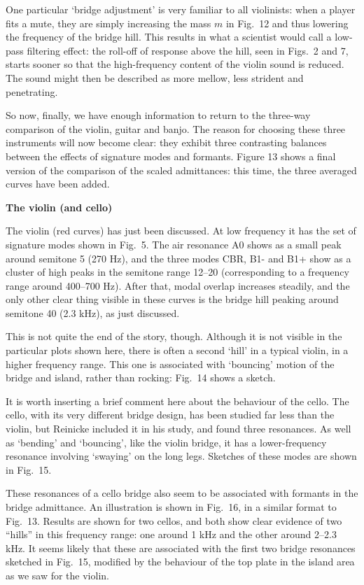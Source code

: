   One particular `bridge adjustment' is very familiar to all violinists: when a 
  player fits a mute, they are simply increasing the mass $m$ in Fig.\ 12 and 
  thus lowering the frequency of the bridge hill. This results in what a 
  scientist would call a low-pass filtering effect: the roll-off of response 
  above the hill, seen in Figs.\ 2 and 7, starts sooner so that the 
  high-frequency content of the violin sound is reduced. The sound might then 
  be described as more mellow, less strident and penetrating. 

  So now, finally, we have enough information to return to the three-way 
  comparison of the violin, guitar and banjo. The reason for choosing these 
  three instruments will now become clear: they exhibit three contrasting 
  balances between the effects of signature modes and formants. Figure 13 shows 
  a final version of the comparison of the scaled admittances: this time, the 
  three averaged curves have been added. 

  \textbf{The violin (and cello)} 

  The violin (red curves) has just been discussed. At low frequency it has the 
  set of signature modes shown in Fig.\ 5. The air resonance A0 shows as a 
  small peak around semitone 5 (270 Hz), and the three modes CBR, B1- and B1+ 
  show as a cluster of high peaks in the semitone range 12--20 (corresponding 
  to a frequency range around 400--700 Hz). After that, modal overlap increases 
  steadily, and the only other clear thing visible in these curves is the 
  bridge hill peaking around semitone 40 (2.3 kHz), as just discussed. 

  This is not quite the end of the story, though. Although it is not visible in 
  the particular plots shown here, there is often a second `hill' in a typical 
  violin, in a higher frequency range. This one is associated with `bouncing' 
  motion of the bridge and island, rather than rocking: Fig.\ 14 shows a 
  sketch. 

  It is worth inserting a brief comment here about the behaviour of the cello. 
  The cello, with its very different bridge design, has been studied far less 
  than the violin, but Reinicke included it in his study, and found three 
  resonances. As well as `bending' and `bouncing', like the violin bridge, it 
  has a lower-frequency resonance involving `swaying' on the long legs. 
  Sketches of these modes are shown in Fig.\ 15. 

  These resonances of a cello bridge also seem to be associated with formants 
  in the bridge admittance. An illustration is shown in Fig.\ 16, in a similar 
  format to Fig.\ 13. Results are shown for two cellos, and both show clear 
  evidence of two ``hills'' in this frequency range: one around 1 kHz and the 
  other around 2--2.3 kHz. It seems likely that these are associated with the 
  first two bridge resonances sketched in Fig.\ 15, modified by the behaviour 
  of the top plate in the island area as we saw for the violin. 


